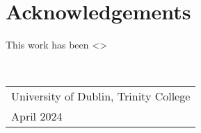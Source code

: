 \chapter*{Acknowledgements}

\begin{spacing}{1.5}
This work has been <>
\end{spacing}

{
\par \vspace{20mm}
 \\[10mm]
\raggedright {{\slshape \begin{tabular}{l}University of Dublin, Trinity College \\ April 2024\end{tabular}}}
}
